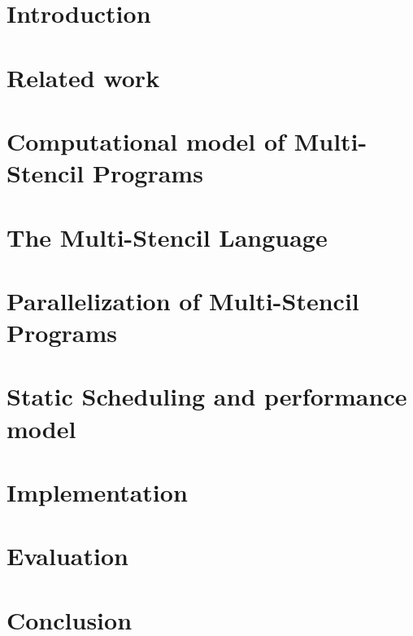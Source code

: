 \documentclass[smallextended]{svjour3}       %
\begin{document}
\section{Introduction}
\label{sect:introduction}

\section{Related work}
\label{sect:rel}

\section{Computational model of Multi-Stencil Programs}
\label{sect:formalism}

\section{The Multi-Stencil Language}
\label{sect:msl}

\section{Parallelization of Multi-Stencil Programs}
\label{sect:parallelism}

\section{Static Scheduling and performance model}
\label{sect:msp}

\section{Implementation}
\label{sect:comp}

\section{Evaluation}
\label{sect:eval}

\section{Conclusion}
\label{sect:concl}





\end{document}
